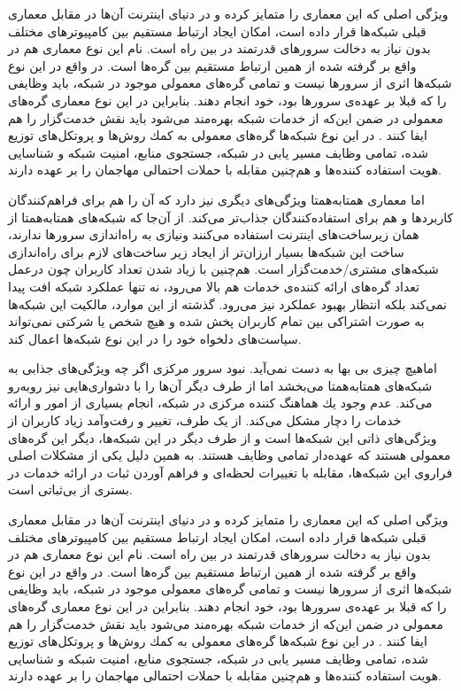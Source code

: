 \documentclass[12pt,twoside]{xepersian-magazine}
\begin{document}
\begin{article}{2}
ويژگی اصلی که اين معماری را متمايز کرده و در دنيای اينترنت آن‌ها در مقابل معماری قبلی شبكه‌ها قرار داده است، امكان ايجاد ارتباط مستقيم  بين كامپيوترهای مختلف بدون نياز به دخالت سرورهای قدرتمند در بين راه است.  نام‌ اين نوع معماری هم در واقع بر گرفته شده از همین  ارتباط مستقیم بين گره‌ها است.  در واقع در اين نوع شبكه‌ها اثری از سرورها نيست و تمامی گره‌های معمولی موجود در شبكه، بايد وظايفی را که قبلا بر عهده‌ی سرورها بود، خود انجام دهند. بنابراين در اين نوع معماری گره‌های معمولی در ضمن اين‌که از خدمات شبکه بهره‌مند می‌شود بايد نقش خدمت‌گزار را هم ايفا کنند . در اين نوع شبکه‌ها گره‌های معمولی به كمك روش‌ها و پروتكل‌های توزيع شده، تمامی وظايف  مسير يابی در شبكه، جستجوی منابع، امنيت شبكه و شناسايی هويت استفاده كننده‌ها و هم‌چنين مقابله با حملات احتمالی مهاجمان را بر عهده دارند.

اما معماری همتابه‌همتا ويژگی‌های ديگری نيز دارد که آن را هم برای فراهم‌کنندگان کاربردها و هم برای استفاده‌کنندگان جذاب‌تر می‌کند.  از آن‌جا که شبکه‌های همتابه‌همتا از همان زيرساخت‌های اينترنت استفاده می‌کنند ونيازی به راه‌اندازی سرورها ندارند، ساخت اين شبكه‌ها بسيار ارزان‌تر از ايجاد زير ساخت‌های لازم برای راه‌اندازی شبكه‌های مشتری/خدمت‌گزار است.  هم‌چنين با زياد شدن تعداد کاربران چون درعمل تعداد گره‌های ارائه کننده‌ی خدمات هم بالا می‌رود، نه تنها عملكرد شبكه افت پيدا نمی‌كند بلكه انتظار بهبود عملکرد نيز می‌رود. گذشته از اين موارد، مالكيت اين شبكه‌ها به صورت اشتراكی بين تمام کاربران پخش شده و هيچ شخص يا شركتی نمی‌تواند سياست‌های دلخواه خود را در اين نوع شبكه‌ها اعمال کند.

اماهيچ چيزی بی‌ بها به دست نمی‌آید. نبود سرور مرکزی اگر چه  ويژگی‌های جذابی به شبکه‌های همتابه‌همتا می‌بخشد اما از طرف ديگر آن‌ها را با دشواری‌هايی نيز روبه‌رو می‌کند.  عدم وجود يك هماهنگ كننده مركزی در شبكه، انجام بسياری از امور و ارائه خدمات را  دچار مشكل می‌کند.  از يک طرف، تغيير و رفت‌وآمد زیاد کاربران از ويژگی‌های ذاتی اين شبکه‌ها است و از طرف ديگر در اين شبكه‌ها، ديگر اين گره‌های معمولی  هستند كه  عهده‌دار تمامی وظايف هستند. به همين دلیل يکی از مشکلات اصلی فراروی اين شبكه‌ها، مقابله با  تغييرات لحظه‌ای و فراهم آوردن ثبات در ارائه  خدمات در بستری از بی‌ثباتی است.


ويژگی اصلی که اين معماری را متمايز کرده و در دنيای اينترنت آن‌ها در مقابل معماری قبلی شبكه‌ها قرار داده است، امكان ايجاد ارتباط مستقيم  بين كامپيوترهای مختلف بدون نياز به دخالت سرورهای قدرتمند در بين راه است.  نام‌ اين نوع معماری هم در واقع بر گرفته شده از همین  ارتباط مستقیم بين گره‌ها است.  در واقع در اين نوع شبكه‌ها اثری از سرورها نيست و تمامی گره‌های معمولی موجود در شبكه، بايد وظايفی را که قبلا بر عهده‌ی سرورها بود، خود انجام دهند. بنابراين در اين نوع معماری گره‌های معمولی در ضمن اين‌که از خدمات شبکه بهره‌مند می‌شود بايد نقش خدمت‌گزار را هم ايفا کنند . در اين نوع شبکه‌ها گره‌های معمولی به كمك روش‌ها و پروتكل‌های توزيع شده، تمامی وظايف  مسير يابی در شبكه، جستجوی منابع، امنيت شبكه و شناسايی هويت استفاده كننده‌ها و هم‌چنين مقابله با حملات احتمالی مهاجمان را بر عهده دارند.


\end{article}
\end{document}
